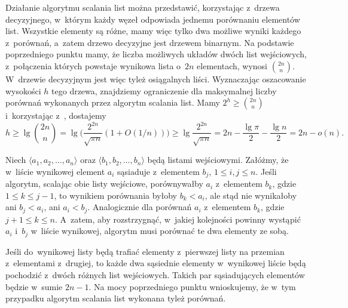 \subproblem %
Działanie algorytmu scalania list można przedstawić, korzystając z~drzewa decyzyjnego, w~którym każdy węzeł odpowiada jednemu porównaniu elementów list. Wszystkie elementy są różne, mamy więc tylko dwa możliwe wyniki każdego z~porównań, a~zatem drzewo decyzyjne jest drzewem binarnym. Na podstawie poprzedniego punktu mamy, że liczba możliwych układów dwóch  list wejściowych, z~połączenia których powstaje wynikowa lista o~$2n$ elementach, wynosi $\binom{2n}{n}$. W~drzewie decyzyjnym jest więc tyleż osiągalnych liści. Wyznaczając oszacowanie wysokości $h$ tego drzewa, znajdziemy ograniczenie dla maksymalnej liczby porównań wykonanych przez algorytm scalania list. Mamy $2^h\ge\binom{2n}{n}$ i~korzystając z~, dostajemy
\[
    h \ge \lg\binom{2n}{n} = \lg\biggl(\frac{2^{2n}}{\sqrt{\pi n}}(1+O(1/n))\biggr) \ge \lg\frac{2^{2n}}{\sqrt{\pi n}} = 2n-\frac{\lg\pi}{2}-\frac{\lg n}{2} = 2n-o(n).
\]

\subproblem %
Niech $\langle a_1,a_2,\dots,a_n\rangle$ oraz $\langle b_1,b_2,\dots,b_n\rangle$ będą listami wejściowymi. Załóżmy, że w~liście wynikowej element $a_i$ sąsiaduje z~elementem $b_j$, $1\le i,j\le n$. Jeśli algorytm, scalając obie listy wejściowe, porównywałby $a_i$ z~elementem $b_k$, gdzie $1\le k\le j-1$, to wynikiem porównania byłoby $b_k<a_i$, ale stąd nie wynikałoby ani $b_j<a_i$, ani $a_i<b_j$. Analogicznie dla porównań $a_i$ z~elementem $b_k$, gdzie $j+1\le k\le n$. A~zatem, aby rozstrzygnąć, w~jakiej kolejności powinny wystąpić $a_i$ i~$b_j$ w~liście wynikowej, algorytm musi porównać te dwa elementy ze sobą.

\subproblem %
Jeśli do~wynikowej listy będą trafiać elementy z~pierwszej listy na przemian z~elementami z~drugiej, to każde dwa sąsiednie elementy w~wynikowej liście będą pochodzić z~dwóch różnych list wejściowych. Takich par sąsiadujących elementów będzie w~sumie $2n-1$. Na mocy poprzedniego punktu wnioskujemy, że w~tym przypadku algorytm scalania list wykonana tyleż porównań.

\endinput
